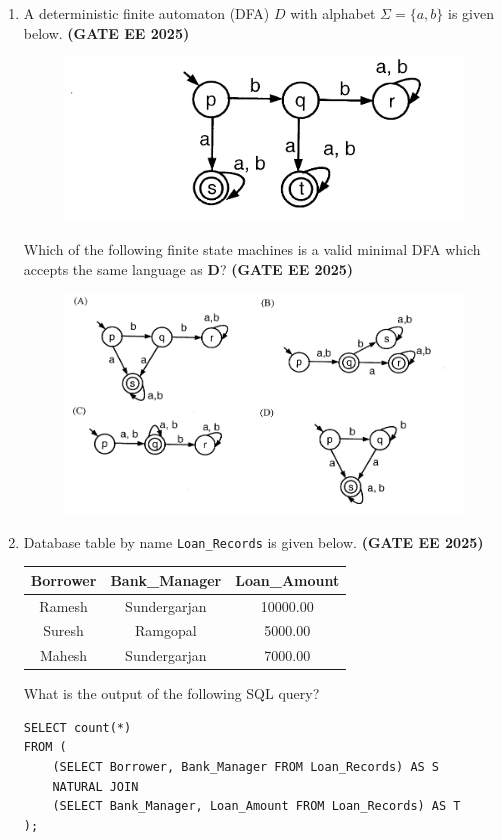 \documentclass[journal,12pt,onecolumn]{IEEEtran}
\theoremstyle{remark}
\begin{document}
\begin{enumerate}
\item  A deterministic finite automaton (DFA) \(D\) with alphabet \(\Sigma = \{a, b\}\) is given below.  \hfill \textbf{(GATE EE 2025)}
\begin{figure}[h]
    \centering
    \includegraphics[width=0.5\linewidth]{figs/fig7.png}
    \caption{ }
    \label{fig7}
\end{figure}

Which of the following finite state machines is a valid minimal DFA which accepts the same language as \textbf{D}? \hfill \textbf{(GATE EE 2025)}
\begin{figure}[H]
    \centering
    \includegraphics[width=0.5\linewidth]{figs/fig8.png}
    \caption{}
    \label{fig8}
\end{figure}

\item  Database table by name \texttt{Loan\_Records} is given below. \hfill \textbf{(GATE EE 2025)}  

\begin{center}
\begin{tabular}{|c|c|c|}
\hline
\textbf{Borrower} & \textbf{Bank\_Manager} & \textbf{Loan\_Amount} \\
\hline
Ramesh & Sundergarjan & 10000.00 \\ \hline
Suresh & Ramgopal & 5000.00 \\ \hline
Mahesh & Sundergarjan & 7000.00 \\ 
\hline
\end{tabular}
\end{center}

What is the output of the following SQL query?

\begin{verbatim}
SELECT count(*)
FROM (
    (SELECT Borrower, Bank_Manager FROM Loan_Records) AS S
    NATURAL JOIN
    (SELECT Bank_Manager, Loan_Amount FROM Loan_Records) AS T
);
\end{verbatim}


\end{enumerate}
\end{document}
